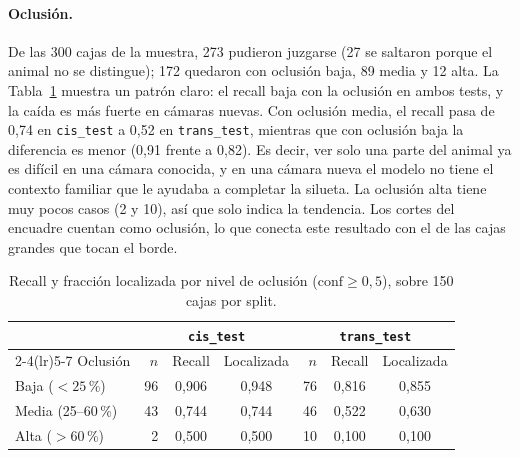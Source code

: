 \paragraph{Oclusión.} De las 300 cajas de la muestra, 273 pudieron juzgarse
(27 se saltaron porque el animal no se distingue); 172 quedaron con oclusión
baja, 89 media y 12 alta. La Tabla~\ref{tab:oclusion} muestra un patrón claro:
el recall baja con la oclusión en ambos tests, y la caída es más fuerte en
cámaras nuevas. Con oclusión media, el recall pasa de 0,74 en
\texttt{cis\_test} a 0,52 en \texttt{trans\_test}, mientras que con oclusión
baja la diferencia es menor (0,91 frente a 0,82). Es decir, ver solo una parte
del animal ya es difícil en una cámara conocida, y en una cámara nueva el
modelo no tiene el contexto familiar que le ayudaba a completar la silueta. La
oclusión alta tiene muy pocos casos (2 y 10), así que solo indica la tendencia.
Los cortes del encuadre cuentan como oclusión, lo que conecta este resultado
con el de las cajas grandes que tocan el borde.

\begin{table}[htbp]
  \centering
  \caption{Recall y fracción localizada por nivel de oclusión ($\text{conf}\geq0{,}5$),
  sobre 150 cajas por split.}
  \label{tab:oclusion}
  \begin{tabular}{lrccrcc}
    \toprule
     & \multicolumn{3}{c}{\texttt{cis\_test}} & \multicolumn{3}{c}{\texttt{trans\_test}} \\
    \cmidrule(lr){2-4}\cmidrule(lr){5-7}
    Oclusión & $n$ & Recall & Localizada & $n$ & Recall & Localizada \\
    \midrule
    Baja ($<25$\,\%)   & 96 & 0,906 & 0,948 & 76 & 0,816 & 0,855 \\
    Media (25--60\,\%) & 43 & 0,744 & 0,744 & 46 & 0,522 & 0,630 \\
    Alta ($>60$\,\%)   &  2 & 0,500 & 0,500 & 10 & 0,100 & 0,100 \\
    \bottomrule
  \end{tabular}
\end{table}

